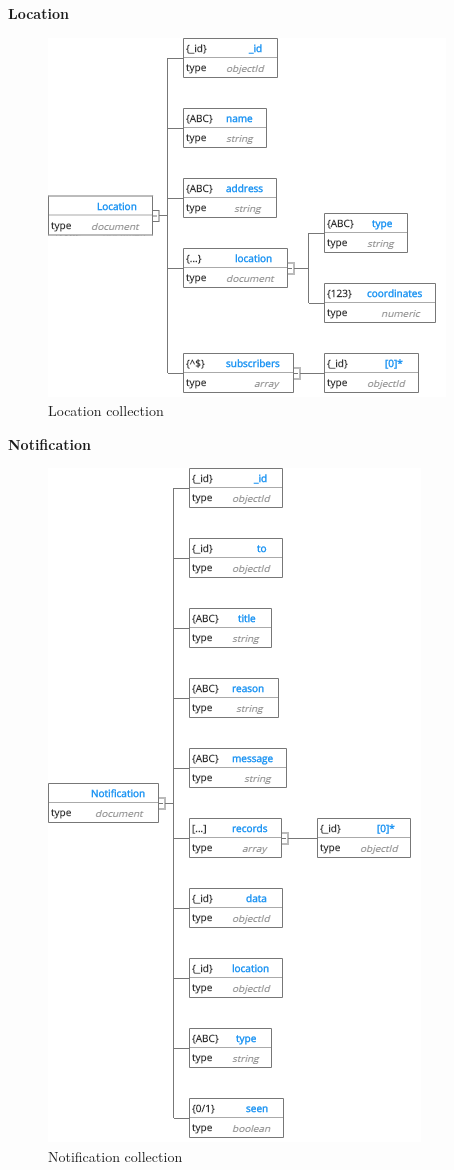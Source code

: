 \cleardoublepage
\textbf{Location}
\begin{center}
	\begin{figure}[H]
		\centering
		\includegraphics[width=1\columnwidth]{images/chap4/Location.png}
		\caption{Location collection}
	\end{figure}
\end{center}
\cleardoublepage
\textbf{Notification}
\begin{center}
	\begin{figure}[H]
		\centering
		\includegraphics[width=0.7\columnwidth]{images/chap4/Notification.png}
		\caption{Notification collection}
	\end{figure}
\end{center}
